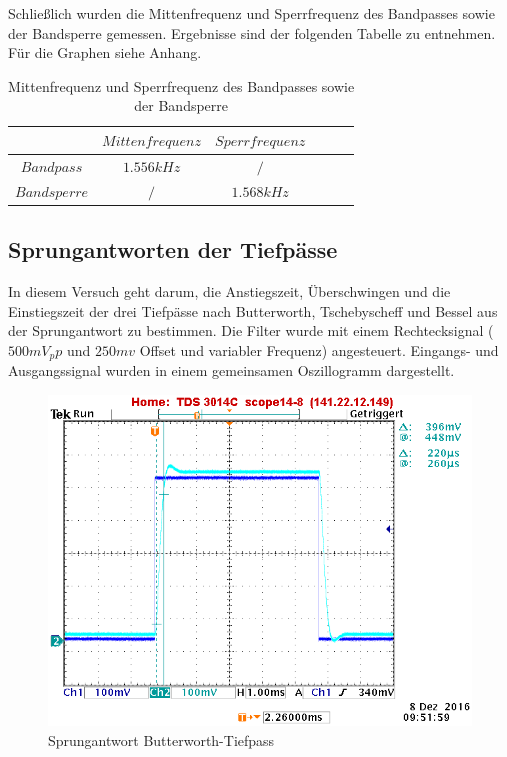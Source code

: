 \noindent Schließlich wurden die Mittenfrequenz und Sperrfrequenz des Bandpasses sowie der Bandsperre gemessen. Ergebnisse sind der folgenden Tabelle zu entnehmen. Für die Graphen siehe Anhang.

\begin{table}[h]
	\centering
	\begin{tabular}{c|c|c|c|c|c}
		$ $          & $Mittenfrequenz$ & $Sperrfrequenz$  \\
		\hline
		$Bandpass$   & $1.556kHz$       & $/$         \\
		$Bandsperre$ & $/$              & $1.568kHz$  \\   
	\end{tabular}
	\caption{Mittenfrequenz und Sperrfrequenz des Bandpasses sowie der Bandsperre}
	\label{tab:grenzfrequnzen_bs_bp}
\end{table}

\newpage

\subsection{Sprungantworten der Tiefpässe}
\noindent In diesem Versuch geht darum, die Anstiegszeit, Überschwingen und die Einstiegszeit der drei Tiefpässe nach Butterworth, Tschebyscheff und Bessel aus der Sprungantwort zu bestimmen. Die Filter wurde mit einem Rechtecksignal ($500mV_pp$ und $250mv$ Offset und variabler Frequenz) angesteuert. Eingangs- und Ausgangssignal wurden in einem gemeinsamen Oszillogramm dargestellt. 

\begin{figure}[h]
\centering
\includegraphics[width=0.7\linewidth]{Bilder/ImLabor/Sprungantwort_5_8_Butter_Anstiegszeit}
\caption{Sprungantwort Butterworth-Tiefpass}
\label{fig:Sprungantwort_5_8_Butter_Anstiegszeit}
\end{figure}

